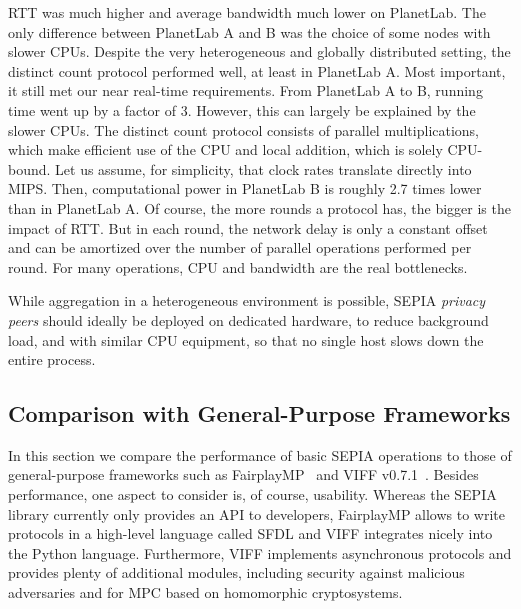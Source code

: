 \documentclass[letterpaper,11pt,onecolumn,titlepage]{article}
\begin{document}
RTT was much higher and average bandwidth much lower on PlanetLab. 
The only difference between PlanetLab A and B was the choice of some nodes with slower CPUs. Despite the very heterogeneous
and globally distributed setting, the distinct count protocol performed well, at least in PlanetLab A.
Most important, it still met our near real-time requirements.
From PlanetLab A to B, running time went up by a factor of 3. However, this can largely be explained by the slower CPUs.
The distinct count protocol consists of parallel multiplications, which make efficient use of the CPU and local addition, which is solely CPU-bound. 
Let us assume, for simplicity, that clock rates translate directly into MIPS. Then, computational power in PlanetLab B is roughly 2.7 times lower than in PlanetLab A.  
Of course, the more rounds a protocol has, the bigger is the impact of RTT. But in each round, the network delay is
only a constant offset and can be amortized over the number of parallel operations performed per round. For 
many operations, CPU and bandwidth are the real bottlenecks.

While aggregation in a heterogeneous environment is possible, SEPIA \emph{privacy peers} should ideally be deployed on dedicated hardware, to reduce background load, and with similar CPU equipment, so that no single host slows down the entire process.

\subsection{Comparison with General-Purpose Frameworks}
\label{sec:eval_frameworks}







In this section we compare the performance of basic SEPIA operations to those of general-purpose frameworks such as FairplayMP~\cite{fairplayMP} and VIFF v0.7.1~\cite{damgard2009asynchronous}. Besides performance, one aspect to consider is, of course, usability. Whereas the SEPIA library currently only provides an API to developers, FairplayMP allows to write protocols in a high-level language called SFDL and VIFF integrates nicely into the Python language. Furthermore, VIFF implements asynchronous protocols and provides plenty of additional modules, including security against malicious adversaries and for MPC based on homomorphic cryptosystems. 
\end{document}
